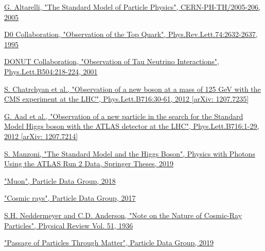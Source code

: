 \documentclass[a4paper, 11pt]{report}
\begin{document}
  
  


\begin{thebibliography}{1}

\href{https://arxiv.org/abs/hep-ph/0510281}{G. Altarelli,
"The Standard Model of Particle Physics",
CERN-PH-TH/2005-206, 2005}

\href{https://arxiv.org/abs/hep-ex/9503003}{D0 Collaboration,
"Observation of the Top Quark",
Phys.Rev.Lett.74:2632-2637, 1995}

\href{https://arxiv.org/abs/hep-ex/0012035}{DONUT Collaboration, 
"Observation of Tau Neutrino Interactions",
Phys.Lett.B504:218-224, 2001}

\href{https://arxiv.org/abs/1207.7235}{S. Chatrchyan et al.,
"Observation of a new boson at a mass of 125 GeV with the CMS experiment at the LHC",
Phys.Lett.B716:30-61, 2012 [arXiv: 1207.7235]
}

\href{https://arxiv.org/abs/1207.7214}{G. Aad et al.,
"Observation of a new particle in the search for the Standard Model Higgs boson with the ATLAS detector at the LHC", 
Phys.Lett.B716:1-29, 2012 [arXiv: 1207.7214]}

\href{https://link.springer.com/chapter/10.1007/978-3-030-24370-8_2#citeas}{S. Manzoni, 
"The Standard Model and the Higgs Boson",
Physics with Photons Using the ATLAS Run 2 Data, Springer Theses, 2019
}

\href{http://pdg.lbl.gov/2018/listings/rpp2018-list-muon.pdf}{
"Muon", Particle Data Group, 2018}

\href{http://pdg.lbl.gov/2017/reviews/rpp2017-rev-cosmic-rays.pdf}{
"Cosmic rays", Particle Data Group, 2017}

\href{http://web.ihep.su/dbserv/compas/src/neddermeyer37/eng.pdf}{S.H. Neddermeyer and C.D. Anderson,
"Note on the Nature of Cosmic-Ray Particles", 
Physical Review Vol. 51, 1936}

\href{http://pdg.lbl.gov/2019/reviews/rpp2019-rev-passage-particles-matter.pdf}{
"Passage of Particles Through Matter", Particle Data Group, 2019}


\end{thebibliography}
\end{document}
